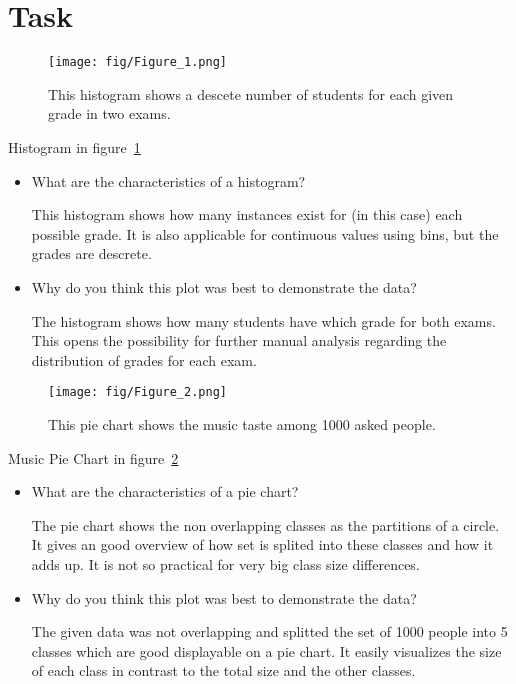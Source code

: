\documentclass[a4paper, 11pt]{article}
\begin{document}
\section{Task}
\begin{figure}[h!] 
    \centering
    \texttt{[image: fig/Figure\_1.png]}
    \caption{This histogram shows a descete number of students for each given grade in two exams.}
    \label{fig:grades}
\end{figure}

Histogram in figure~\ref{fig:grades}

\begin{itemize}
    \item What are the characteristics of a histogram?

    This histogram shows how many instances exist for (in this case) each possible grade. It is also applicable for continuous values using bins, but the grades are descrete.

    \item Why do you think this plot was best to demonstrate the data?
    
    The histogram shows how many students have which grade for both exams. This opens the possibility for further manual analysis regarding the distribution of grades for each exam.
\end{itemize}

\newpage

\begin{figure}[h!] 
    \centering
    \texttt{[image: fig/Figure\_2.png]}
    \caption{This pie chart shows the music taste among 1000 asked people.}
    \label{fig:music}
\end{figure}

Music Pie Chart in figure~\ref{fig:music}

\begin{itemize}
    \item What are the characteristics of a pie chart?

    The pie chart shows the non overlapping classes as the partitions of a circle. 
    It gives an good overview of how set is splited into these classes and how it adds up. 
    It is not so practical for very big class size differences.

    \item Why do you think this plot was best to demonstrate the data?
    
    The given data was not overlapping and splitted the set of 1000 people into 5 classes which are good displayable on a pie chart. 
    It easily visualizes the size of each class in contrast to the total size and the other classes. 
\end{itemize}
\end{document}
